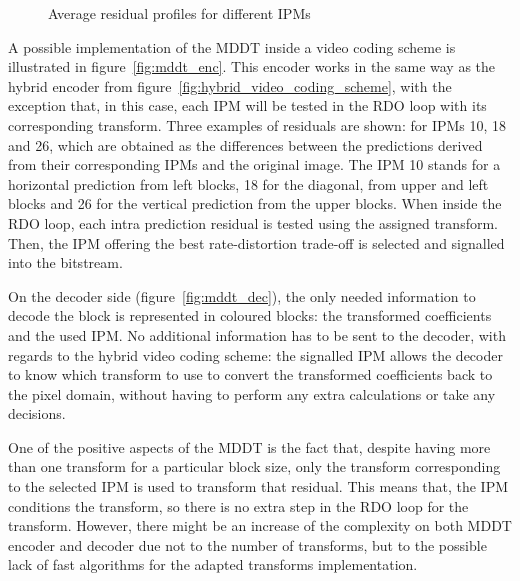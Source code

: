 \documentclass[11pt,a4paper,openright,twoside]{book}
\numberwithin{equation}{section} %
\numberwithin{figure}{section} %
\numberwithin{table}{section} %
\begin{document}
\begin{figure}[tb]
	\hfill
	\hfill
	\caption{Average residual profiles for different \acsp{IPM}}
	\label{fig:residual_differences}
\end{figure}

A possible implementation of the \ac{MDDT} inside a video coding scheme is
illustrated in figure~\ref{fig:mddt_enc}.
This encoder works in the same way as the hybrid encoder from
figure~\ref{fig:hybrid_video_coding_scheme}, with the exception that, in this
case, each \ac{IPM} will be tested in the \ac{RDO} loop with its corresponding
transform.
Three examples of residuals are shown:
for \acp{IPM} 10, 18 and 26, which are obtained as the differences between the
predictions derived from their corresponding \acp{IPM} and the original image.
The \ac{IPM} 10 stands for a horizontal prediction from left blocks, 18 for
the diagonal, from upper and left blocks and 26 for the vertical prediction
from the upper blocks.
When inside the \ac{RDO} loop, each intra prediction residual is tested using
the assigned transform.
Then, the \ac{IPM} offering the best rate-distortion trade-off is selected and
signalled into the bitstream.

On the decoder side (figure~\ref{fig:mddt_dec}), the only needed information
to decode the block is represented in coloured blocks:
the transformed coefficients and the used \ac{IPM}.
No additional information has to be sent to the decoder, with regards to the
hybrid video coding scheme:
the signalled \ac{IPM} allows the decoder to know which transform to use to
convert the transformed coefficients back to the pixel domain, without having
to perform any extra calculations or take any decisions.

One of the positive aspects of the \ac{MDDT} is the fact that, despite having
more than one transform for a particular block size, only the transform
corresponding to the selected \ac{IPM} is used to transform that residual.
This means that, the \ac{IPM} conditions the transform, so there is no extra
step in the \ac{RDO} loop for the transform.
However, there might be an increase of the complexity on both \ac{MDDT}
encoder and decoder due not to the number of transforms, but to the possible
lack of fast algorithms for the adapted transforms implementation.
\end{document}
